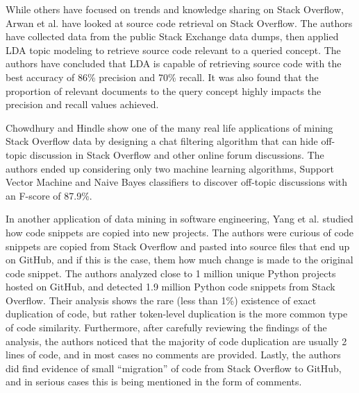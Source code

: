         While others have focused on trends and knowledge sharing on Stack Overflow, Arwan et al. \cite{arwan2015source} have looked at source code retrieval on Stack Overflow. The authors have collected data from the public Stack Exchange data dumps, then applied LDA topic modeling to retrieve source code relevant to a queried concept. The authors have concluded that LDA is capable of retrieving source code with the best accuracy of 86\% precision and 70\% recall. It was also found that the proportion of relevant documents to the query concept highly impacts the precision and recall values achieved.
        
        Chowdhury and Hindle \cite{chowdhury2015mining} show one of the many real life applications of mining Stack Overflow data by designing a chat filtering algorithm that can hide off-topic discussion in Stack Overflow and other online forum discussions. The authors ended up considering only two machine learning algorithms, Support Vector Machine and Naive Bayes classifiers to discover off-topic discussions with an F-score of 87.9\%.
        
        In another application of data mining in software engineering, Yang et al. \cite{yang2017stack} studied how code snippets are copied into new projects. The authors were curious of code snippets are copied from Stack Overflow and pasted into source files that end up on GitHub, and if this is the case, them how much change is made to the original code snippet. The authors analyzed close to 1 million unique Python projects hosted on GitHub, and detected 1.9 million Python code snippets from Stack Overflow. Their analysis shows the rare (less than 1\%) existence of exact duplication of code, but rather token-level duplication is the more common type of code similarity. Furthermore, after carefully reviewing the findings of the analysis, the authors noticed that the majority of code duplication are usually 2 lines of code, and in most cases no comments are provided. Lastly, the authors did find evidence of small ``migration'' of code from Stack Overflow to GitHub, and in serious cases this is being mentioned in the form of comments.
        
